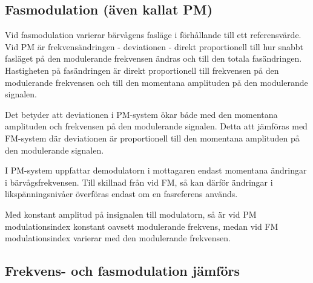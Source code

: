 \subsection{Fasmodulation (även kallat PM)}

Vid fasmodulation varierar bärvågens fasläge i förhållande till ett
referensvärde. Vid PM är frekvensändringen - deviationen - direkt proportionell
till hur snabbt fasläget på den modulerande frekvensen ändras och till den
totala fasändringen. Hastigheten på fasändringen är direkt proportionell till
frekvensen på den modulerande frekvensen och till den momentana amplituden på
den modulerande signalen.

Det betyder att deviationen i PM-system ökar både med den momentana amplituden
och frekvensen på den modulerande signalen. Detta att jämföras med FM-system där
deviationen är proportionell till den momentana amplituden på den modulerande
signalen.

I PM-system uppfattar demodulatorn i mottagaren endast momentana ändringar i
bärvågsfrekvensen. Till skillnad från vid FM, så kan därför ändringar i
likspänningsnivåer överföras endast om en fasreferens används.

Med konstant amplitud på insignalen till modulatorn, så är vid PM
modulationsindex konstant oavsett modulerande frekvens, medan vid FM
modulationsindex varierar med den modulerande frekvensen.

\subsection{Frekvens- och fasmodulation jämförs}

